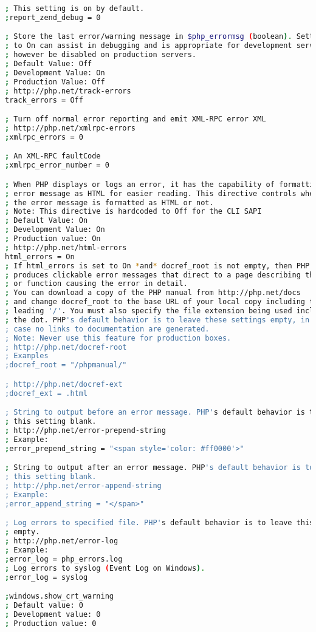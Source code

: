 \begin{lstlisting}[language=bash]
; This setting is on by default.
;report_zend_debug = 0

; Store the last error/warning message in $php_errormsg (boolean). Setting this value
; to On can assist in debugging and is appropriate for development servers. It should
; however be disabled on production servers.
; Default Value: Off
; Development Value: On
; Production Value: Off
; http://php.net/track-errors
track_errors = Off

; Turn off normal error reporting and emit XML-RPC error XML
; http://php.net/xmlrpc-errors
;xmlrpc_errors = 0

; An XML-RPC faultCode
;xmlrpc_error_number = 0

; When PHP displays or logs an error, it has the capability of formatting the
; error message as HTML for easier reading. This directive controls whether
; the error message is formatted as HTML or not.
; Note: This directive is hardcoded to Off for the CLI SAPI
; Default Value: On
; Development Value: On
; Production value: On
; http://php.net/html-errors
html_errors = On
; If html_errors is set to On *and* docref_root is not empty, then PHP
; produces clickable error messages that direct to a page describing the error
; or function causing the error in detail.
; You can download a copy of the PHP manual from http://php.net/docs
; and change docref_root to the base URL of your local copy including the
; leading '/'. You must also specify the file extension being used including
; the dot. PHP's default behavior is to leave these settings empty, in which
; case no links to documentation are generated.
; Note: Never use this feature for production boxes.
; http://php.net/docref-root
; Examples
;docref_root = "/phpmanual/"

; http://php.net/docref-ext
;docref_ext = .html

; String to output before an error message. PHP's default behavior is to leave
; this setting blank.
; http://php.net/error-prepend-string
; Example:
;error_prepend_string = "<span style='color: #ff0000'>"

; String to output after an error message. PHP's default behavior is to leave
; this setting blank.
; http://php.net/error-append-string
; Example:
;error_append_string = "</span>"

; Log errors to specified file. PHP's default behavior is to leave this value
; empty.
; http://php.net/error-log
; Example:
;error_log = php_errors.log
; Log errors to syslog (Event Log on Windows).
;error_log = syslog

;windows.show_crt_warning
; Default value: 0
; Development value: 0
; Production value: 0
\end{lstlisting}


